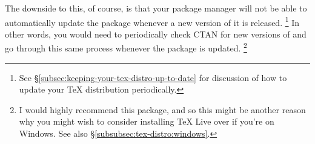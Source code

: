 The downside to this, of course, is that your package manager will not be able to automatically update the  package whenever a new version of it is released.%
\footnote{%
See \S\ref{subsec:keeping-your-tex-distro-up-to-date} for discussion of how to update your \TeX{} distribution periodically.
}
In other words, you would need to periodically check CTAN for new versions of  and go through this same process whenever the package is updated.%
\footnote{%
I would highly recommend this package, and so this might be another reason why you might wish to consider installing TeX Live over  if you're on Windows.
See also \S\ref{subsubsec:tex-distro:windows}.%
}